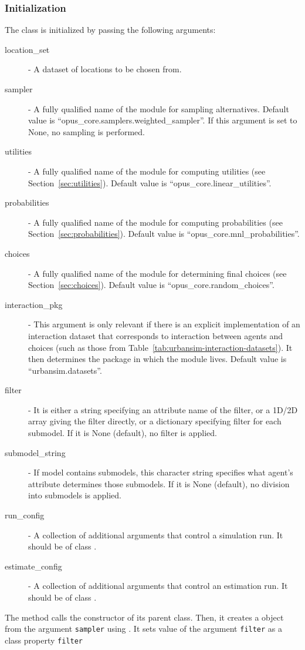 \subsubsection{Initialization}
%
The class is initialized by passing the following arguments:
\begin{description}
\item[location_set] - A dataset of locations to be chosen from.
\item[sampler] - A fully qualified name of the module for sampling
  alternatives. Default value is ``opus_core.samplers.weighted_sampler''. If
  this argument is set to None, no sampling is performed.
\item[utilities] - A fully qualified name of the module for computing utilities
  (see Section~\ref{sec:utilities}). Default value is
  ``opus_core.linear_utilities''.
\item[probabilities] - A fully qualified name of the module for computing
  probabilities (see Section~\ref{sec:probabilities}). Default value is
  ``opus_core.mnl_probabilities''.
\item[choices] - A fully qualified name of the module for determining
  final choices (see Section~\ref{sec:choices}). Default value is
  ``opus_core.random_choices''.
\item[interaction_pkg] - This argument is only relevant if there is an
  explicit implementation of an interaction dataset that corresponds to
  interaction between agents and choices (such as those from
  Table~\ref{tab:urbansim-interaction-datasets}). It then determines the
  package in which the module lives. Default value is
  ``urbansim.datasets''. 
\item[filter] - It is either a string specifying an attribute name of the
  filter, or a 1D/2D array giving the filter directly, or a dictionary
  specifying filter for each submodel. If it is None (default), no filter is
  applied.
\item[submodel_string] - If model contains submodels, this character string
  specifies what agent's attribute determines those submodels. If it is None
  (default), no division into submodels is applied.
\item[run_config] - A collection of additional arguments that control a
  simulation run. It should be of class .
\item[estimate_config] - A collection of additional arguments that control an
  estimation run. It should be of class .
\end{description}
The method calls the constructor of its parent class. Then, it creates a
 object from the argument \verb|sampler| using
. It sets value of the argument \verb|filter| as a class
property \verb|filter|

